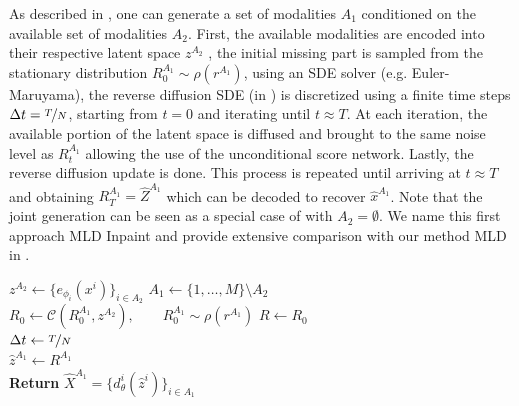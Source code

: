 As described in , one can generate a set of modalities $A_1$ conditioned on the available set of modalities $A_2$. First, the available modalities are encoded into their respective latent space $z^{A_2}$ , the initial missing part is sampled from the stationary distribution $R^{A_1}_0 \sim \rho(r^{A_1})$, using an \gls{SDE} solver (e.g. Euler-Maruyama), the reverse diffusion \gls{SDE} (in ) is discretized using a finite time steps $\Delta t = \nicefrac{T}{N} $, starting from $t = 0$ and iterating until $t\approx T$. At each iteration, the available portion of the latent space is diffused and brought to the same noise level as $R_t^{A_1}$ allowing the use of the unconditional score network. Lastly, the reverse diffusion update is done. This process is repeated until arriving at $t\approx T$ and obtaining $R^{A_1}_T = \hat{Z}^{A_1}$ which can be decoded to recover $\hat{x}^{A_1}$.
Note that the joint generation can be seen as a special case of  with $A_2 = \emptyset$. We name this first approach \gls{MLD Inpaint} and provide extensive comparison with our method \gls{MLD} in .


\begin{algorithm}[hbt!] 
\DontPrintSemicolon
\SetAlgoLined
\SetNoFillComment
\LinesNotNumbered 
\caption{\gls{MLD Inpaint} conditional generation}\label{algo:MLD_inpaint_cond}
$z^{A_2} \gets \{ e_{\phi_i}(x^i) \}_{i \in A_2} $    
$A_1\gets \{1,\dots,M\}\setminus A_2 $  
$R_0 \gets \mathcal{C} ( R_0^{A_1}, z^{A_2}),  \qquad  R_0^{A_1} \sim \rho(r^{A_1}) $   
$R \gets R_0$ \\
$\Delta t \gets \nicefrac{T}{N}$ \\
 $\hat{z}^{A_1} \gets R^{A_1}$ \\
\textbf{Return} $\hat{X}^{A_1} = \{d^i_\theta(\hat{z}^{i} )\}_{i\in A_1}$  
\end{algorithm}


